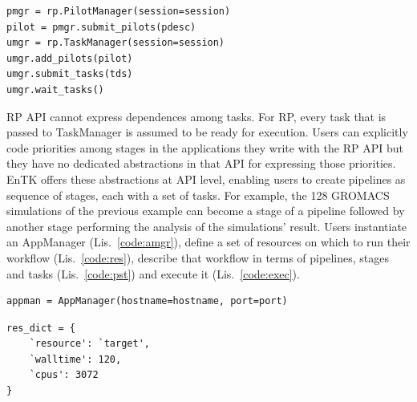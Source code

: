 \documentclass[preprint,12pt, a4paper]{elsarticle}
\begin{document}
\begin{lstlisting}
pmgr = rp.PilotManager(session=session)
pilot = pmgr.submit_pilots(pdesc)
umgr = rp.TaskManager(session=session)
umgr.add_pilots(pilot)
umgr.submit_tasks(tds)
umgr.wait_tasks()
\end{lstlisting}

RP API cannot express dependences among tasks. For RP, every task that is passed
to TaskManager is assumed to be ready for execution. Users can explicitly code
priorities among stages in the applications they write with the RP API but they
have no dedicated abstractions in that API for expressing those priorities. EnTK
offers these abstractions at API level, enabling users to create pipelines as
sequence of stages, each with a set of tasks. For example, the 128 GROMACS
simulations of the previous example can become a stage of a pipeline followed by
another stage performing the analysis of the simulations' result. Users
instantiate an AppManager (Lis.~\ref{code:amgr}), define a set of resources on
which to run their workflow (Lis.~\ref{code:res}), describe that workflow in
terms of pipelines, stages and tasks (Lis.~\ref{code:pst}) and execute it
(Lis.~\ref{code:exec}).

\begin{lstlisting}
appman = AppManager(hostname=hostname, port=port)
\end{lstlisting}

\begin{lstlisting}
res_dict = {
    `resource': `target',
    `walltime': 120,
    `cpus': 3072
}
\end{lstlisting}
\end{document}
